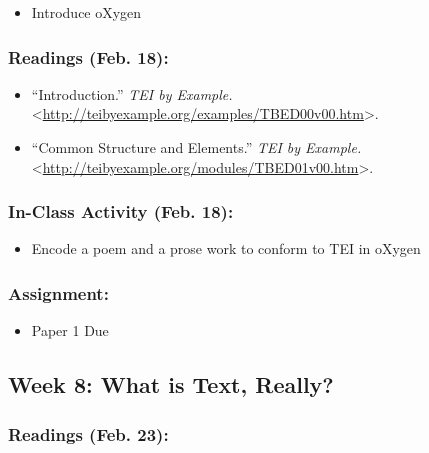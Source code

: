 \documentclass[]{article}
\begin{document}
\begin{itemize}
\itemsep1pt\parskip0pt
\item
  Introduce oXygen
\end{itemize}

\subsubsection{Readings (Feb. 18):}\label{readings-feb.-18}

\begin{itemize}
\itemsep1pt\parskip0pt
\item
  ``Introduction.'' \emph{TEI by Example.}
  \textless{}\url{http://teibyexample.org/examples/TBED00v00.htm}\textgreater{}.
\item
  ``Common Structure and Elements.'' \emph{TEI by Example.}
  \textless{}\url{http://teibyexample.org/modules/TBED01v00.htm}\textgreater{}.
\end{itemize}

\subsubsection{In-Class Activity (Feb.
18):}\label{in-class-activity-feb.-18}

\begin{itemize}
\itemsep1pt\parskip0pt
\item
  Encode a poem and a prose work to conform to TEI in oXygen
\end{itemize}

\subsubsection{Assignment:}\label{assignment}

\begin{itemize}
\itemsep1pt\parskip0pt
\item
  Paper 1 Due
\end{itemize}

\subsection{Week 8: What is Text,
Really?}\label{week-8-what-is-text-really}

\subsubsection{Readings (Feb. 23):}\label{readings-feb.-23}
\end{document}
